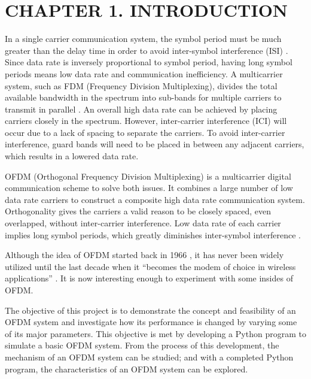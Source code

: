 \section*{CHAPTER 1. INTRODUCTION}
\setcounter{section}{1}
\setcounter{subsection}{0}
\setcounter{figure}{0}
\setcounter{table}{0}

In a single carrier communication system, the symbol period must be much greater than the delay time in order to avoid inter-symbol interference (ISI) \cite{b1}. Since data rate is inversely proportional to symbol period, having long symbol periods means low data rate and communication inefficiency. A multicarrier system, such as FDM (Frequency Division Multiplexing), divides the total available bandwidth in the spectrum into sub-bands for multiple carriers to transmit in parallel \cite{b2}. An overall high data rate can be achieved by placing carriers closely in the spectrum. However, inter-carrier interference (ICI) will occur due to a lack of spacing to separate the carriers. To avoid inter-carrier interference, guard bands will need to be placed in between any adjacent carriers, which results in a lowered data rate.

OFDM (Orthogonal Frequency Division Multiplexing) is a multicarrier digital communication scheme to solve both issues. It combines a large number of low data rate carriers to construct a composite high data rate communication system. Orthogonality gives the carriers a valid reason to be closely spaced, even overlapped, without inter-carrier interference. Low data rate of each carrier implies long symbol periods, which greatly diminishes inter-symbol interference \cite{b3}.

Although the idea of OFDM started back in 1966 \cite{b4}, it has never been widely utilized until the last decade when it “becomes the modem of choice in wireless applications” \cite{b5}. It is now interesting enough to experiment with some insides of OFDM.

The objective of this project is to demonstrate the concept and feasibility of an OFDM system and investigate how its performance is changed by varying some of its major parameters. This objective is met by developing a Python program to simulate a basic OFDM system. From the process of this development, the mechanism of an OFDM system can be studied; and with a completed Python program, the characteristics of an OFDM system can be explored.